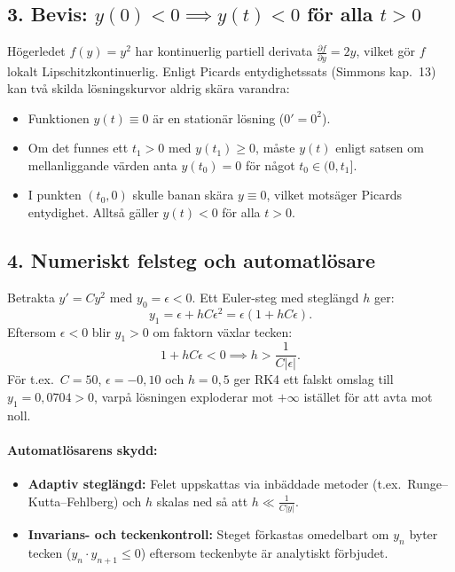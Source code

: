 \documentclass{article}
\begin{document}
\subsection*{3. Bevis: $y(0) < 0 \implies y(t) < 0$ för alla $t > 0$}
Högerledet $f(y) = y^2$ har kontinuerlig partiell derivata $\frac{\partial f}{\partial y} = 2y$, vilket gör $f$ lokalt Lipschitzkontinuerlig. Enligt Picards entydighetssats (Simmons kap.~13) kan två skilda lösningskurvor aldrig skära varandra:
\begin{itemize}
    \item Funktionen $y(t) \equiv 0$ är en stationär lösning ($0' = 0^2$).
    \item Om det funnes ett $t_1 > 0$ med $y(t_1) \ge 0$, måste $y(t)$ enligt satsen om mellanliggande värden anta $y(t_0) = 0$ för något $t_0 \in (0, t_1]$.
    \item I punkten $(t_0, 0)$ skulle banan skära $y \equiv 0$, vilket motsäger Picards entydighet. Alltså gäller $y(t) < 0$ för alla $t > 0$.
\end{itemize}

\subsection*{4. Numeriskt felsteg och automatlösare}
Betrakta $y' = C y^2$ med $y_0 = \epsilon < 0$. Ett Euler-steg med steglängd $h$ ger:
\begin{equation}
    y_1 = \epsilon + h C \epsilon^2 = \epsilon (1 + h C \epsilon).
\end{equation}
Eftersom $\epsilon < 0$ blir $y_1 > 0$ om faktorn växlar tecken:
\begin{equation}
    1 + h C \epsilon < 0 \implies h > \frac{1}{C |\epsilon|}.
\end{equation}
För t.ex.\ $C = 50$, $\epsilon = -0{,}10$ och $h = 0{,}5$ ger RK4 ett falskt omslag till $y_1 = 0{,}0704 > 0$, varpå lösningen exploderar mot $+\infty$ istället för att avta mot noll.

\paragraph{Automatlösarens skydd:}
\begin{itemize}
    \item \textbf{Adaptiv steglängd:} Felet uppskattas via inbäddade metoder (t.ex.\ Runge--Kutta--Fehlberg) och $h$ skalas ned så att $h \ll \frac{1}{C|y|}$.
    \item \textbf{Invarians- och teckenkontroll:} Steget förkastas omedelbart om $y_n$ byter tecken ($y_n \cdot y_{n+1} \le 0$) eftersom teckenbyte är analytiskt förbjudet.
\end{itemize}
\end{document}
